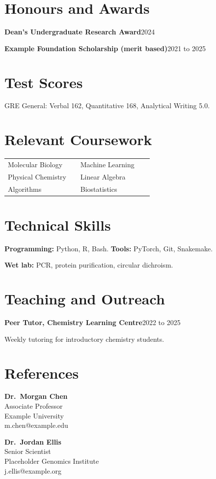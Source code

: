 \documentclass[11pt]{article}
\newcommand{\cventry}[2]{\textbf{#1}\hfill #2\par}
\begin{document}
\section{Honours and Awards}
\cventry{Dean's Undergraduate Research Award}{2024}
\cventry{Example Foundation Scholarship (merit based)}{2021 to 2025}

\section{Test Scores}
GRE General: Verbal 162, Quantitative 168, Analytical Writing 5.0.

\section{Relevant Coursework}
\begin{tabular}[t]{@{}p{0.45\linewidth}p{0.45\linewidth}@{}}
  Molecular Biology & Machine Learning \\
  Physical Chemistry & Linear Algebra \\
  Algorithms & Biostatistics \\
\end{tabular}

\section{Technical Skills}
\textbf{Programming:} Python, R, Bash. \textbf{Tools:} PyTorch, Git, Snakemake.\par
\textbf{Wet lab:} PCR, protein purification, circular dichroism.

\section{Teaching and Outreach}
\cventry{Peer Tutor, Chemistry Learning Centre}{2022 to 2025}
Weekly tutoring for introductory chemistry students.

\section{References}
\begin{minipage}[t]{0.48\linewidth}
  \textbf{Dr.\ Morgan Chen}\\
  Associate Professor\\
  Example University\\
  m.chen@example.edu
\end{minipage}\hfill
\begin{minipage}[t]{0.48\linewidth}
  \textbf{Dr.\ Jordan Ellis}\\
  Senior Scientist\\
  Placeholder Genomics Institute\\
  j.ellis@example.org
\end{minipage}
\end{document}
